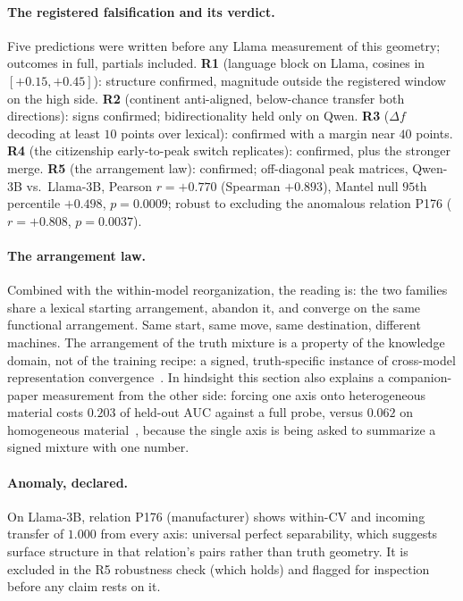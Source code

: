 \documentclass[11pt]{article}
\begin{document}
\paragraph{The registered falsification and its verdict.} Five predictions
were written before any Llama measurement of this geometry; outcomes in
full, partials included. \textbf{R1} (language block on Llama, cosines in
$[+0.15, +0.45]$): structure confirmed, magnitude outside the registered
window on the high side. \textbf{R2} (continent anti-aligned, below-chance
transfer both directions): signs confirmed; bidirectionality held only on
Qwen. \textbf{R3} ($\Delta f$ decoding at least $10$ points over lexical):
confirmed with a margin near $40$ points. \textbf{R4} (the citizenship
early-to-peak switch replicates): confirmed, plus the stronger merge.
\textbf{R5} (the arrangement law): confirmed; off-diagonal peak matrices,
Qwen-3B vs.\ Llama-3B, Pearson $r = +0.770$ (Spearman $+0.893$), Mantel
null $95$th percentile $+0.498$, $p = 0.0009$; robust to excluding the
anomalous relation P176 ($r = +0.808$, $p = 0.0037$).

\paragraph{The arrangement law.} Combined with the within-model
reorganization, the reading is: the two families share a lexical starting
arrangement, abandon it, and converge on the same functional arrangement.
Same start, same move, same destination, different machines. The
arrangement of the truth mixture is a property of the knowledge domain, not
of the training recipe: a signed, truth-specific instance of cross-model
representation convergence~\cite{platonic2024}. In hindsight this section
also explains a companion-paper measurement from the other side: forcing
one axis onto heterogeneous material costs $0.203$ of held-out AUC against
a full probe, versus $0.062$ on homogeneous material~\cite{companion},
because the single axis is being asked to summarize a signed mixture with
one number.

\paragraph{Anomaly, declared.} On Llama-3B, relation P176 (manufacturer)
shows within-CV and incoming transfer of $1.000$ from every axis:
universal perfect separability, which suggests surface structure in that
relation's pairs rather than truth geometry. It is excluded in the R5
robustness check (which holds) and flagged for inspection before any claim
rests on it.
\end{document}
